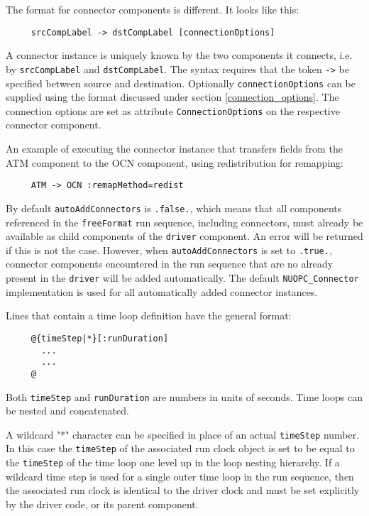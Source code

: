   The format for connector components is different. It looks like this:
  
   \begin{verbatim}
     srcCompLabel -> dstCompLabel [connectionOptions]
   \end{verbatim}
   A connector instance is uniquely known by the two components it connects, 
   i.e. by {\tt srcCompLabel} and {\tt dstCompLabel}. The syntax requires that
   the token {\tt ->} be specified between source and destination. Optionally
   {\tt connectionOptions} can be supplied using the format discussed 
   under section \ref{connection_options}. The connection options are set
   as attribute {\tt ConnectionOptions} on the respective connector component.
  
   An example of executing the connector
   instance that transfers fields from the ATM component to the OCN component,
   using redistribution for remapping:
   
   \begin{verbatim}
     ATM -> OCN :remapMethod=redist
   \end{verbatim}
  
   By default {\tt autoAddConnectors} is {\tt .false.}, which means that all 
   components referenced in the {\tt freeFormat} run sequence, including 
   connectors, must already be available as child components of the {\tt driver}
   component. An error will be returned if this is not the case. 
   However, when {\tt autoAddConnectors} is set to {\tt .true.}, connector
   components encountered in the run sequence that are no already present in 
   the {\tt driver} will be added automatically. The default 
   {\tt NUOPC\_Connector} implementation is used for all automatically added
   connector instances.
  
   Lines that contain a time loop definition have the general format:
  
   \begin{verbatim}
     @{timeStep|*}[:runDuration]
       ...
       ...
     @
   \end{verbatim}
   Both {\tt timeStep} and {\tt runDuration} are numbers in units of seconds.
   Time loops can be nested and concatenated.
  
   A wildcard "*" character can be specified in place of an actual {\tt timeStep}
   number. In this case the {\tt timeStep} of the associated run clock object
   is set to be equal to the {\tt timeStep} of the time loop one level up in the
   loop nesting hierarchy.
   If a wildcard time step is used for a single outer time loop in the run
   sequence, then the associated run clock is identical to the driver clock and
   must be set explicitly by the driver code, or its parent component.
  
